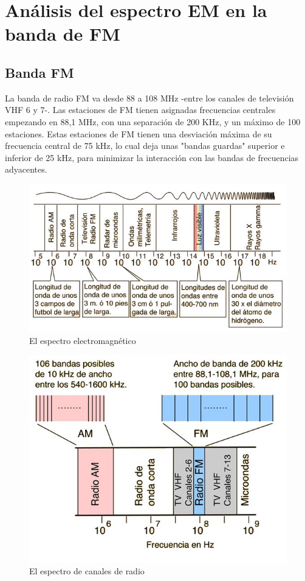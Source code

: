 \chapter{Análisis del espectro EM en la banda de FM}
\section{Banda FM}
La banda de radio FM va desde 88 a 108 MHz -entre los canales de televisión
VHF 6 y 7-. Las estaciones de FM tienen asignadas frecuencias centrales
empezando en 88,1 MHz, con una separación de 200 KHz, y un máximo de 100
estaciones. Estas estaciones de FM tienen una desviación máxima de su frecuencia
central de 75 kHz, lo cual deja unas "bandas guardas" superior e inferior
de 25 kHz, para minimizar la interacción con las bandas de frecuencias adyacentes.

\begin{figure}[ht]
    \begin{center}
        \includegraphics[scale= 0.7]{contenido/img/ej6espectrofm.jpg}
        \caption{El espectro electromagnético}
    \end{center}
\end{figure}

\begin{figure}[ht]
    \begin{center}
        \includegraphics[scale= 0.7]{contenido/img/ej6espectroradio.jpg}
        \caption{El espectro de canales de radio}
    \end{center}
\end{figure}

